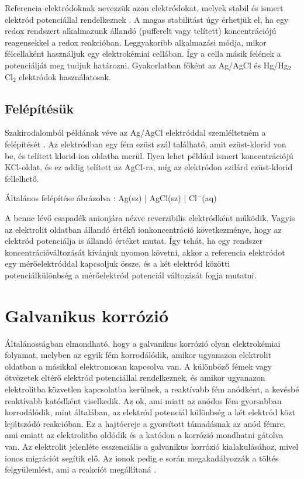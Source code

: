 Referencia elektródoknak nevezzük azon elektródokat, melyek stabil és ismert elektród potenciállal rendelkeznek \cite{allen2001electrochemical}. A magas stabilitást úgy érhetjük el, ha egy redox rendszert alkalmazunk állandó (pufferelt vagy telített) koncentrációjú reagensekkel a redox reakcióban. Leggyakoribb alkalmazási módja, mikor félcellaként használjuk egy elektrokémiai cellában. Így a cella másik felének a potenciálját meg tudjuk határozni. Gyakorlatban főként az Ag/AgCl és Hg/Hg$_2$Cl$_2$ elektródok használatosak. 

\subsection{Felépítésük}

Szakirodalomból példának véve az Ag/AgCl elektróddal szemléltetném a felépítését \cite{janz1968silver}. Az elektródban egy fém ezüst szál található, amit ezüst-klorid von be, és telített klorid-ion oldatba merül. Ilyen lehet például ismert koncentrációjú KCl-oldat, és ez addig telített az AgCl-ra, míg az elektródon szilárd ezüst-klorid fellelhető.

Általános felépítése ábrázolva : Ag(sz) | AgCl(sz) | Cl$^-$(aq)

A benne lévő csapadék anionjára nézve reverzibilis elektródként működik. Vagyis az elektrolit oldatban állandó értékű ionkoncentráció következménye, hogy az elektród potenciálja is állandó értéket mutat. Így tehát, ha egy rendszer koncentrációváltozását kívánjuk nyomon követni, akkor a referencia elektródot egy mérőelektróddal kapcsoljuk össze, és a két elektród közötti potenciálkülönbség a mérőelektród potenciál változását fogja mutatni.

\section{Galvanikus korrózió}

Általánosságban elmondható, hogy a galvanikus korrózió olyan elektrokémiai folyamat, melyben az egyik fém korrodálódik, amikor ugyanazon elektrolit oldatban a másikkal elektromosan kapcsolva van. A különböző fémek vagy ötvözetek eltérő elektród potenciállal rendelkeznek, és amikor ugyanazon elektrolitba közvetlen kapcsolatba kerülnek, a reaktívabb fém anódként, a kevésbé reaktívabb katódként viselkedik. Az ok, ami miatt az anódos fém gyorsabban korrodálódik, mint általában, az elektród potenciál különbség a két elektród közt lejátszódó reakcióban. Ez a hajtóereje a gyorsított támadásnak az anód fémre, ami emiatt az elektrolitba oldódik és a katódon a korrózió mondhatni gátolva van. Az elektrolit jelenléte esszenciális a galvanikus korrózió kialakulásához, mivel ionos migrációt segítik elő. Az ionok pedig e során megakadályozzák a töltés felgyülemlést, ami a reakciót megállítaná \cite{fontana2018corrosion}. 

